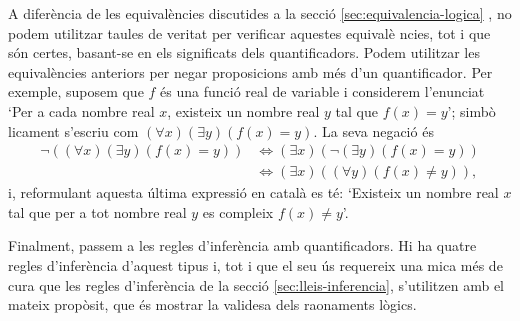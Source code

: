 A difer\`{e}ncia de les equival\`{e}ncies discutides a la secci\'{o} \ref{sec:equivalencia-logica}%
, no podem utilitzar taules de veritat per verificar aquestes equival\`{e}%
ncies, tot i que s\'{o}n certes, basant-se en els significats dels
quantificadors. Podem utilitzar les equival\`{e}ncies anteriors per negar
proposicions amb m\'{e}s d'un quantificador. Per exemple, suposem que $f$
\'{e}s una funci\'{o} real de variable i considerem l'enunciat `Per a cada
nombre real $x$, existeix un nombre real $y$ tal que $f(x)=y$'; simb\`{o}%
licament s'escriu com $\left( \forall x\right) \left( \exists y\right)
\left( f(x)=y\right) $. La seva negaci\'{o} \'{e}s%
\begin{align*}
\lnot\left( \left( \forall x\right) \left( \exists y\right) \left(
f(x)=y\right) \right) & \Longleftrightarrow\left( \exists x\right) \left(
\lnot\left( \exists y\right) \left( f(x)=y\right) \right) \\
& \Longleftrightarrow\left( \exists x\right) \left( \left( \forall y\right)
\left( f(x)\neq y\right) \right) \text{,}
\end{align*}
i, reformulant aquesta \'{u}ltima expressi\'{o} en catal\`{a} es t\'{e}:
`Existeix un nombre real $x$ tal que per a tot nombre real $y$ es compleix $%
f(x)\neq y$'.

\bigskip

Finalment, passem a les regles d'infer\`{e}ncia amb quantificadors. Hi ha
quatre regles d'infer\`{e}ncia d'aquest tipus i, tot i que el seu \'{u}s
requereix una mica m\'{e}s de cura que les regles d'infer\`{e}ncia de la
secci\'{o} \ref{sec:lleis-inferencia}, s'utilitzen amb el mateix prop\`{o}sit, que \'{e}s
mostrar la validesa dels raonaments l\`{o}gics.

